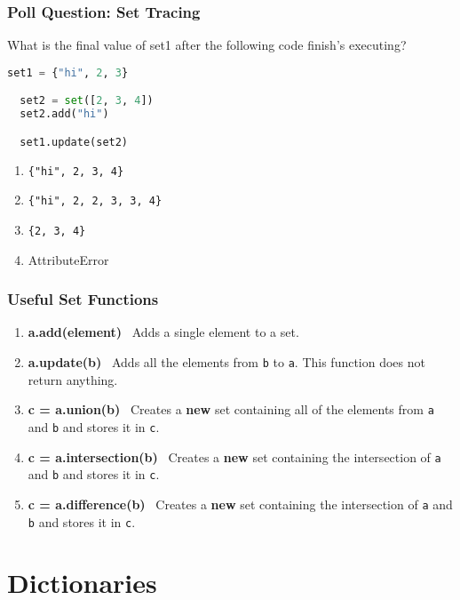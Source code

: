 \documentclass[xcolor=table]{beamer}
\begin{document}
%
%
\begin{frame}[fragile]
  \frametitle{Poll Question: Set Tracing}
  What is the final value of set1 after the following code finish's executing?
  \begin{lstlisting}[language=Python, autogobble]
  set1 = {"hi", 2, 3}

  set2 = set([2, 3, 4])
  set2.add("hi")

  set1.update(set2)
  \end{lstlisting}
  \vfill
  \begin{enumerate}[A] 
    \item \lstinline|{"hi", 2, 3, 4}| %
    \item \lstinline|{"hi", 2, 2, 3, 3, 4}|
    \item \lstinline|{2, 3, 4}|
    \item AttributeError
  \end{enumerate}
\end{frame}

%
%
\begin{frame}[fragile]
  \frametitle{Useful Set Functions}
  \begin{enumerate}
    \item \textbf{a.add(element)} \textrightarrow \ Adds a single element to a set.
    \item \textbf{a.update(b)} \textrightarrow \ Adds all the elements from \lstinline|b| to \lstinline|a|. This function does not return anything.
    \item \textbf{c = a.union(b)} \textrightarrow \ Creates a \textbf{new} set containing all of the elements from \lstinline|a| and \lstinline|b| and stores it in \lstinline|c|.
    \item \textbf{c = a.intersection(b)} \textrightarrow \ Creates a \textbf{new} set containing the intersection of \lstinline|a| and \lstinline|b| and stores it in \lstinline|c|.
    \item \textbf{c = a.difference(b)} \textrightarrow \ Creates a \textbf{new} set containing the intersection of \lstinline|a| and \lstinline|b| and stores it in \lstinline|c|.
  \end{enumerate}
\end{frame}



\section{Dictionaries}
\end{document}
